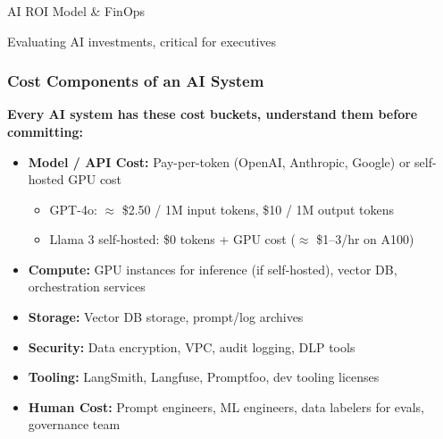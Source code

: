 \begin{frame}[fragile]\frametitle{}
\begin{center}
{\Large AI ROI Model \& FinOps}

{\small Evaluating AI investments, critical for executives}
\end{center}
\end{frame}

\begin{frame}[fragile]\frametitle{Cost Components of an AI System}
\textbf{Every AI system has these cost buckets, understand them before committing:}
\begin{itemize}
\item \textbf{Model / API Cost:} Pay-per-token (OpenAI, Anthropic, Google) or self-hosted GPU cost
  \begin{itemize}
  \item GPT-4o: $\approx$ \$2.50 / 1M input tokens, \$10 / 1M output tokens
  \item Llama 3 self-hosted: \$0 tokens + GPU cost ($\approx$ \$1--3/hr on A100)
  \end{itemize}
\item \textbf{Compute:} GPU instances for inference (if self-hosted), vector DB, orchestration services
\item \textbf{Storage:} Vector DB storage, prompt/log archives
\item \textbf{Security:} Data encryption, VPC, audit logging, DLP tools
\item \textbf{Tooling:} LangSmith, Langfuse, Promptfoo, dev tooling licenses
\item \textbf{Human Cost:} Prompt engineers, ML engineers, data labelers for evals, governance team
\end{itemize}
\end{frame}


